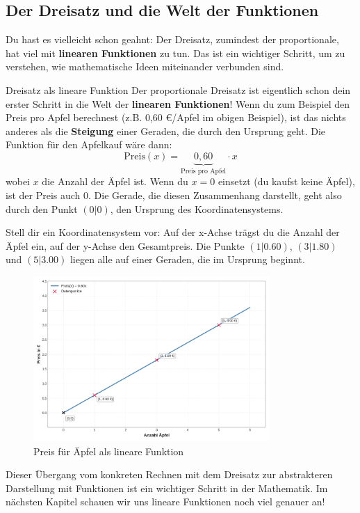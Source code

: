 \subsection*{Der Dreisatz und die Welt der Funktionen}

Du hast es vielleicht schon geahnt: Der Dreisatz, zumindest der proportionale, hat viel mit \textbf{linearen Funktionen} zu tun. Das ist ein wichtiger Schritt, um zu verstehen, wie mathematische Ideen miteinander verbunden sind.

\begin{merksatzumgebung}{Dreisatz als lineare Funktion}
Der proportionale Dreisatz ist eigentlich schon dein erster Schritt in die Welt der \textbf{linearen Funktionen}!
Wenn du zum Beispiel den Preis pro Apfel berechnest (z.B. 0,60 €/Apfel im obigen Beispiel), ist das nichts anderes als die \textbf{Steigung} einer Geraden, die durch den Ursprung geht.
Die Funktion für den Apfelkauf wäre dann:
\[ \text{Preis}(x) = \underbrace{0,60}_{\text{Preis pro Apfel}} \cdot x \]
wobei $x$ die Anzahl der Äpfel ist. Wenn du $x=0$ einsetzt (du kaufst keine Äpfel), ist der Preis auch 0. Die Gerade, die diesen Zusammenhang darstellt, geht also durch den Punkt $(0|0)$, den Ursprung des Koordinatensystems.
\end{merksatzumgebung}

Stell dir ein Koordinatensystem vor: Auf der x-Achse trägst du die Anzahl der Äpfel ein, auf der y-Achse den Gesamtpreis. Die Punkte $(1|0.60)$, $(3|1.80)$ und $(5|3.00)$ liegen alle auf einer Geraden, die im Ursprung beginnt.

\begin{figure}[htbp] %
    \centering %
    \includegraphics[width=0.8\textwidth]{grafiken/Dreisatz_Apfelpreis_Funktion.png}
    \caption{Preis für Äpfel als lineare Funktion} %
    \label{fig:dreisatz_apfel_funktion}
\end{figure}

Dieser Übergang vom konkreten Rechnen mit dem Dreisatz zur abstrakteren Darstellung mit Funktionen ist ein wichtiger Schritt in der Mathematik. Im nächsten Kapitel schauen wir uns lineare Funktionen noch viel genauer an!